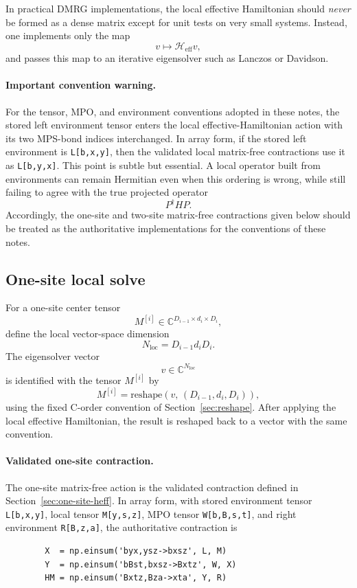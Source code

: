 \documentclass[aps,prb,onecolumn,nofootinbib]{revtex4-2}
\begin{document}
	In practical DMRG implementations, the local effective Hamiltonian should \emph{never}
	be formed as a dense matrix except for unit tests on very small systems. Instead, one
	implements only the map
	\[
	v \mapsto \mathcal{H}_{\mathrm{eff}} v,
	\]
	and passes this map to an iterative eigensolver such as Lanczos or Davidson.
	
	\paragraph{Important convention warning.}
	For the tensor, MPO, and environment conventions adopted in these notes, the stored
	left environment tensor enters the local effective-Hamiltonian action with its two
	MPS-bond indices interchanged. In array form, if the stored left environment is
	\texttt{L[b,x,y]}, then the validated local matrix-free contractions use it as
	\texttt{L[b,y,x]}. This point is subtle but essential. A local operator built from
	environments can remain Hermitian even when this ordering is wrong, while still failing
	to agree with the true projected operator
	\[
	P^\dagger H P.
	\]
	Accordingly, the one-site and two-site matrix-free contractions given below should be
	treated as the authoritative implementations for the conventions of these notes.
	
	\subsection{One-site local solve}
	
	For a one-site center tensor
	\[
	M^{[i]} \in \mathbb{C}^{D_{i-1}\times d_i \times D_i},
	\]
	define the local vector-space dimension
	\[
	N_{\mathrm{loc}} = D_{i-1} d_i D_i.
	\]
	The eigensolver vector
	\[
	v\in\mathbb{C}^{N_{\mathrm{loc}}}
	\]
	is identified with the tensor $M^{[i]}$ by
	\begin{equation}
		M^{[i]} = \mathrm{reshape}(v,\,(D_{i-1},d_i,D_i)),
	\end{equation}
	using the fixed C-order convention of Section~\ref{sec:reshape}. After applying the
	local effective Hamiltonian, the result is reshaped back to a vector with the same convention.
	
	\paragraph{Validated one-site contraction.}
	The one-site matrix-free action is the validated contraction defined in
	Section~\ref{sec:one-site-heff}. In array form, with stored environment tensor
	\texttt{L[b,x,y]}, local tensor \texttt{M[y,s,z]}, MPO tensor \texttt{W[b,B,s,t]},
	and right environment \texttt{R[B,z,a]}, the authoritative contraction is
	\begin{verbatim}
		X  = np.einsum('byx,ysz->bxsz', L, M)
		Y  = np.einsum('bBst,bxsz->Bxtz', W, X)
		HM = np.einsum('Bxtz,Bza->xta', Y, R)
	\end{verbatim}
	
\end{document}
